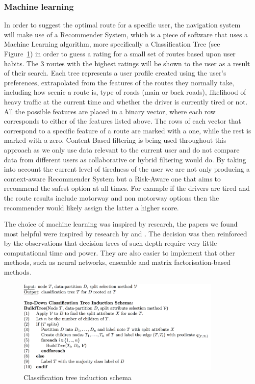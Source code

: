 \documentclass{article}
\begin{document}
\subsubsection{Machine learning}\label{sssec:nav-tech-machinelearning}
In order to suggest the optimal route for a specific user, the navigation system will make use of a Recommender System, which is a piece of software that uses a Machine Learning algorithm, more specifically a Classification Tree (see Figure~\ref{decision-tree}) in order to guess a rating for a small set of routes based upon user habits. 
The 3 routes with the highest ratings will be shown to the user as a result of their search. Each tree represents a user profile created using the user’s preferences, extrapolated from the features of the routes they normally take, including how scenic a route is, type of roads (main or back roads), likelihood of heavy traffic at the current time and whether the driver is currently tired or not. 
All the possible features are placed in a binary vector, where each row corresponds to either of the features listed above. The rows of each vector that correspond to a specific feature of a route are marked with a one, while the rest is marked with a zero. Content-Based filtering is being used throughout this approach as we only use data relevant to the current user and do not compare data from different users as collaborative or hybrid filtering would do. By taking into account the current level of tiredness of the user we are not only producing a context-aware Recommender System but a Risk-Aware one that aims to recommend the safest option at all times. For example if the drivers are tired and the route results include motorway and non motorway options then the recommender would likely assign the latter a higher score.

The choice of machine learning was inspired by research, the papers we found most helpful were inspired by research by \textcite{movie-predictions} and \textcite{reg-tree-construction}. The decision was then reinforced by the observations that decision trees of such depth require very little computational time and power. They are also easier to implement that other methods, such as neural networks, ensemble and matrix factorisation-based methods.

\begin{figure}[H]
  \centering
  \includegraphics[width=0.9\textwidth]{decision-tree}
  \caption{Classification tree induction schema}\label{decision-tree}
\end{figure}
\end{document}
